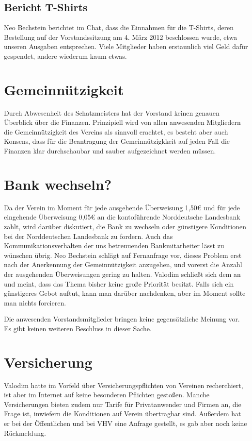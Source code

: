 \documentclass[a4paper,12pt]{scrartcl}
\begin{document}
\subsection{Bericht T-Shirts}
Neo Bechstein berichtet im Chat, dass die Einnahmen für die T-Shirts, deren
Bestellung auf der Vorstandssitzung am 4. März 2012 beschlossen wurde, etwa
unseren Ausgaben entsprechen. Viele Mitglieder haben erstaunlich viel Geld
dafür gespendet, andere wiederum kaum etwas.

\section{Gemeinnützigkeit}
Durch Abwesenheit des Schatzmeisters hat der Vorstand keinen genauen Überblick
über die Finanzen. Prinzipiell wird von allen anwesenden Mitgliedern die
Gemeinnützigkeit des Vereins als sinnvoll erachtet, es besteht aber auch
Konsens, dass für die Beantragung der Gemeinnützigkkeit auf jeden Fall die
Finanzen klar durchschaubar und sauber
aufgezeichnet werden müssen.

\section{Bank wechseln?}
\novote
Da der Verein im Moment für jede ausgehende Überweisung 1{,}50€ und für
jede eingehende Überweisung 0{,}05€ an die kontoführende Norddeutsche Landesbank
zahlt, wird darüber diskutiert, die Bank zu wechseln oder günstigere Konditionen
bei der Norddeutschen Landesbank zu fordern. Auch das Kommunikationsverhalten
der uns betreuuenden Bankmitarbeiter lässt zu wünschen übrig. Neo Bechstein
schlägt auf Fernanfrage vor, dieses Problem erst nach der Anerkennung der
Gemeinnützigkeit anzugehen, und vorerst die Anzahl der ausgehenden Überweisungen
gering zu halten. Valodim schließt sich dem an und meint, dass das Thema bisher
keine große Priorität besitzt. Falls sich ein günstigeres Gebot auftut, kann man
darüber nachdenken, aber im Moment sollte man nichts forcieren.

Die anwesenden Vorstandsmitglieder bringen keine gegensätzliche Meinung vor.
Es gibt keinen weiteren Beschluss in dieser Sache.

\section{Versicherung}
Valodim hatte im Vorfeld über Versicherungspflichten von Vereinen recherchiert,
ist aber im Internet auf keine besonderen Pflichten gestoßen. Manche
Versicherungen bieten zudem nur Tarife für Privatanwender und Firmen an, die
Frage ist, inwiefern die Konditionen auf Verein übertragbar sind. Außerdem hat
er bei der Öffentlichen und bei VHV eine Anfrage gestellt, es gab aber noch
keine Rückmeldung.
\end{document}

